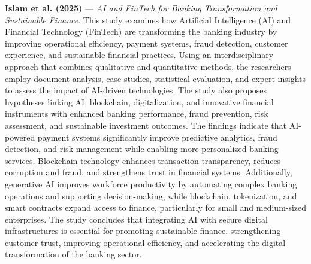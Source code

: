\documentclass[conference]{IEEEtran}
\begin{document}
\noindent\textbf{Islam et al. (2025)}\nocite{Islam2025} --- \emph{AI and FinTech for Banking Transformation and Sustainable Finance}. This study examines how Artificial Intelligence (AI) and Financial Technology (FinTech) are transforming the banking industry by improving operational efficiency, payment systems, fraud detection, customer experience, and sustainable financial practices. Using an interdisciplinary approach that combines qualitative and quantitative methods, the researchers employ document analysis, case studies, statistical evaluation, and expert insights to assess the impact of AI-driven technologies. The study also proposes hypotheses linking AI, blockchain, digitalization, and innovative financial instruments with enhanced banking performance, fraud prevention, risk assessment, and sustainable investment outcomes. The findings indicate that AI-powered payment systems significantly improve predictive analytics, fraud detection, and risk management while enabling more personalized banking services. Blockchain technology enhances transaction transparency, reduces corruption and fraud, and strengthens trust in financial systems. Additionally, generative AI improves workforce productivity by automating complex banking operations and supporting decision-making, while blockchain, tokenization, and smart contracts expand access to finance, particularly for small and medium-sized enterprises. The study concludes that integrating AI with secure digital infrastructures is essential for promoting sustainable finance, strengthening customer trust, improving operational efficiency, and accelerating the digital transformation of the banking sector.

\par\medskip
\end{document}
